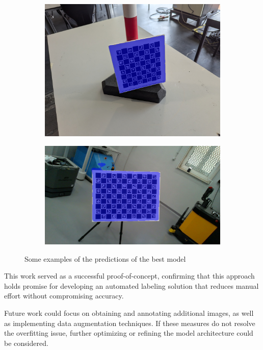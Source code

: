 \begin{figure}[h]
\begin{subfigure}[b]{0.49\linewidth}
            \includegraphics[width=\textwidth]{resources/images/preds/Small_dataset_unet_resnet/pattern_63.jpg}
        \end{subfigure}
    \hfill
        \begin{subfigure}[b]{0.49\linewidth}
            \includegraphics[width=\textwidth]{resources/images/preds/Small_dataset_unet_resnet/rgbd_hand_color_190.jpg}
        \end{subfigure}
    \caption{Some examples of the predictions of the best model}
    \label{fig:prediction_examples}
\end{figure}

This work served as a successful proof-of-concept, confirming that this approach holds promise for developing an automated labeling solution that reduces manual effort without compromising accuracy. 

Future work could focus on obtaining and annotating additional images, as well as implementing data augmentation techniques. If these measures do not resolve the overfitting issue, further optimizing or refining the model architecture could be considered. 